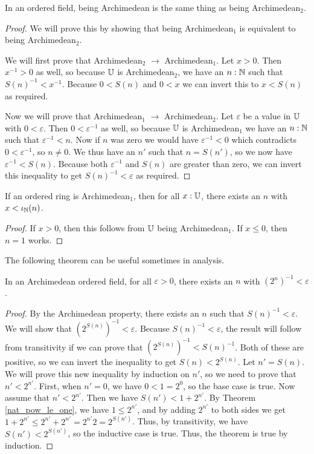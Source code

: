 \documentclass[../math.tex]{subfiles}
\begin{document}
\begin{theorem}
    In an ordered field, being Archimedean is the same thing as being
    Archimedean$_2$.
\end{theorem}
\begin{proof}
    We will prove this by showing that being Archimedean$_1$ is equivalent to
    being \linebreak Archimedean$_2$.

    We will first prove that Archimedean$_2$ $\rightarrow$ Archimedean$_1$.  Let
    $x > 0$.  Then $x^{-1} > 0$ as well, so because $\mathbb{U}$ is Archimedean$_2$, we
    have an $n : \mathbb{N}$ such that $S(n)^{-1} < x^{-1}$.  Because $0 < S(n)$ and $0
    < x$ we can invert this to $x < S(n)$ as required.

    Now we will prove that Archimedean$_1$ $\rightarrow$ Archimedean$_2$.  Let
    $\varepsilon$ be a value in $\mathbb{U}$ with $0 < \varepsilon$.  Then
    $0 < \varepsilon^{-1}$ as well, so because $\mathbb{U}$ is Archimedean$_1$ we have
    an $n : \mathbb{N}$ such that $\varepsilon^{-1} < n$.  Now if $n$ was zero we would
    have $\varepsilon^{-1} < 0$ which contradicts $0 < \varepsilon^{-1}$, so $n
    \neq 0$.  We thus have an $n'$ such that $n = S(n')$, so we now have
    $\varepsilon^{-1} < S(n)$.  Because both $\varepsilon^{-1}$ and $S(n)$ are
    greater than zero, we can invert this inequality to get $S(n)^{-1} <
    \varepsilon$ as required.
\end{proof}

\begin{theorem}
    If an ordered ring is Archimedean$_1$, then for all $x : \mathbb{U}$, there exists
    an $n$ with $x < \iota_{\mathbb{N}}(n)$.
\end{theorem}
\begin{proof}
    If $x > 0$, then this follows from $\mathbb{U}$ being Archimedean$_1$.  If $x \leq
    0$, then $n = 1$ works.
\end{proof}

The following theorem can be useful sometimes in analysis.

\begin{theorem}
    In an Archimedean ordered field, for all $\varepsilon > 0$, there exists an
    $n$ with $(2^n)^{-1} < \varepsilon$.
\end{theorem}
\begin{proof}
    By the Archimedean property, there exists an $n$ such that $S(n)^{-1} <
    \varepsilon$.  We will show that $(2^{S(n)})^{-1} < \varepsilon$.  Because
    $S(n)^{-1} < \varepsilon$, the result will follow from transitivity if we
    can prove that $(2^{S(n)})^{-1} < S(n)^{-1}$.  Both of these are positive,
    so we can invert the inequality to get $S(n) < 2^{S(n)}$.  Let $n' = S(n)$.
    We will prove this new inequality by induction on $n'$, so we need to prove
    that $n' < 2^{n'}$.  First, when $n' = 0$, we have $0 < 1 = 2^0$, so the
    base case is true.  Now assume that $n' < 2^{n'}$.  Then we have $S(n') < 1
    + 2^{n'}$.  By Theorem \ref{nat_pow_le_one}, we have $1 \leq 2^{n'}$, and by
    adding $2^{n'}$ to both sides we get $1 + 2^{n'} \leq 2^{n'} + 2^{n'} =
    2^{n'}2 = 2^{S(n')}$.  Thus, by transitivity, we have $S(n') < 2^{S(n')}$,
    so the inductive case is true.  Thus, the theorem is true by induction.
\end{proof}
\end{document}
